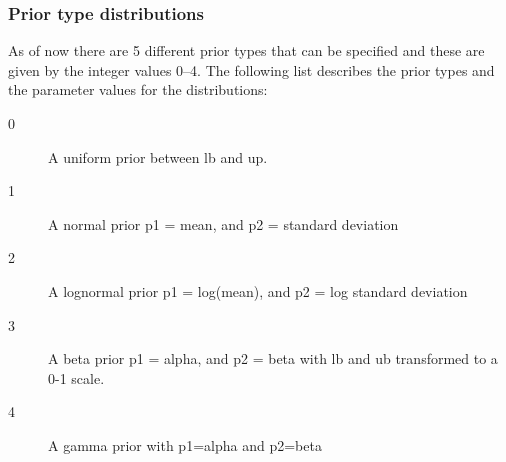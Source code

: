 \begin{multicols}{2}
%	
%	
\subsubsection{Prior type distributions}
As of now there are 5 different prior types that can be specified and these are given by the integer values 0--4.  The following list describes the prior types and the parameter values for the distributions:
\begin{description}
\item[0] A uniform prior between lb and up. 
\item[1] A normal prior p1 = mean, and p2 = standard deviation
\item[2] A lognormal prior p1 = log(mean), and p2 = log standard deviation
\item[3] A beta prior p1 = alpha, and p2 = beta with lb and ub transformed to a 0-1 scale.
\item[4] A gamma prior with p1=alpha and p2=beta
\end{description}


\end{multicols}
